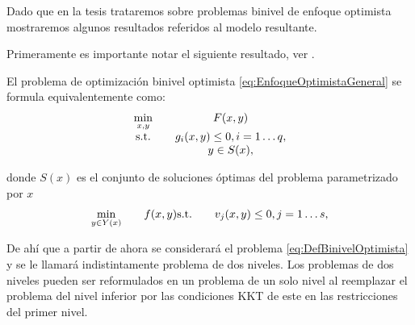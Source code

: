 Dado que en la tesis trataremos sobre problemas binivel de enfoque optimista mostraremos algunos resultados referidos al modelo resultante.

Primeramente es importante notar el siguiente resultado, ver \cite{Scmidtbiblio}.

\begin{proposition} El problema de optimización binivel optimista \eqref{eq:EnfoqueOptimistaGeneral} se formula equivalentemente como:
\begin{equation}\label{eq:DefBinivelOptimista} 
\begin{matrix}
  \displaystyle  \min_{x , y} & \quad F(x, y) \notag \\
    \text{s.t.} & \quad g_i(x, y) \leq 0, i=1\ldots q,  \notag \\
    & \quad y \in S(x), \end{matrix}\end{equation}
  
donde $S(x)$ es el conjunto de soluciones óptimas del problema parametrizado por $x$ 
 \begin{equation}
\begin{matrix} \displaystyle  \min_{y \in Y(x)} & \quad f(x, y)  
    \text{s.t.} & \quad v_j(x, y) \leq 0, j=1\ldots s, \notag \end{matrix}\end{equation}


\end{proposition}
De ahí  que a partir de ahora se considerará el problema \eqref{eq:DefBinivelOptimista} y se le llamará indistintamente problema de dos niveles. 
Los  problemas de dos niveles pueden ser reformulados en un problema de un solo nivel al reemplazar el problema del nivel inferior por las condiciones KKT de este en las restricciones del primer nivel. 
		
        
